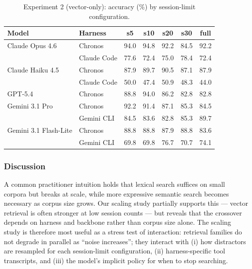 \documentclass[sigconf,nonacm]{acmart}
\begin{document}
\begin{table}[t]
      \caption{Experiment 2 (vector-only): accuracy (\%) by session-limit configuration.}
      \label{tab:exp2-vector-all}
      \centering
      \small
      \setlength{\tabcolsep}{3.5pt}
      \begin{tabular}{@{}llccccc@{}}
        \toprule
        Model & Harness & s5 & s10 & s20 & s30 & full \\
        \midrule
        Claude Opus 4.6       & Chronos      & 94.0 & 94.8 & 92.2 & 84.5 & 92.2 \\
                              & Claude Code  & 77.6 & 72.4 & 75.0 & 78.4 & 72.4 \\
        \midrule
        Claude Haiku 4.5      & Chronos      & 87.9 & 89.7 & 90.5 & 87.1 & 87.9 \\
                              & Claude Code  & 50.0 & 47.4 & 50.9 & 48.3 & 44.0 \\
        \midrule
        GPT-5.4               & Chronos      & 88.8 & 94.0 & 86.2 & 82.8 & 82.8 \\
        \midrule
        Gemini 3.1 Pro        & Chronos      & 92.2 & 91.4 & 87.1 & 85.3 & 84.5 \\
                              & Gemini CLI   & 84.5 & 83.6 & 82.8 & 85.3 & 89.7 \\
        \midrule
        Gemini 3.1 Flash-Lite & Chronos      & 88.8 & 88.8 & 87.9 & 88.8 & 83.6 \\
                              & Gemini CLI   & 69.8 & 69.8 & 76.7 & 70.7 & 74.1 \\
        \bottomrule
      \end{tabular}
  \end{table}

\subsubsection{Discussion}
\label{sec:exp2-discussion}
A common practitioner intuition holds that lexical search suffices on small corpora but breaks at scale, while more expressive semantic search becomes necessary as corpus size grows. Our scaling study partially supports this --- vector retrieval is often stronger at low session counts --- but reveals that the crossover depends on harness and backbone rather than corpus size alone. The scaling study is therefore most useful as a stress test of interaction: retrieval families do not degrade in parallel as ``noise increases''; they interact with (i) how distractors are resampled for each session-limit configuration, (ii) harness-specific tool transcripts, and (iii) the model's implicit policy for when to stop searching.
\end{document}
